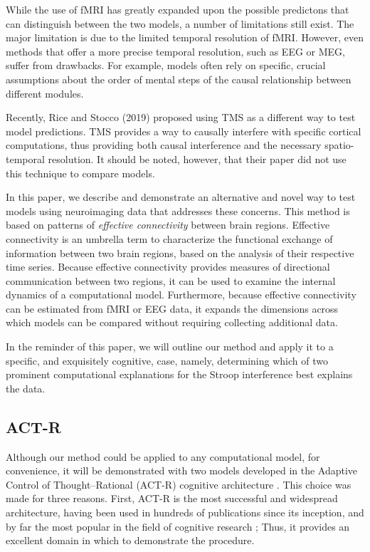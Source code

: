 \documentclass[10pt,letterpaper]{article}
\begin{document}
While the use of fMRI has greatly expanded upon the possible predictons that can distinguish between the two models, a number of limitations still exist. The major limitation is due to the limited temporal resolution of fMRI. 
However, even methods that offer a more precise temporal resolution, such as EEG or MEG, suffer from drawbacks. For example, models often rely on specific, crucial assumptions about the order of mental steps of the causal relationship between different modules. 

Recently, Rice and Stocco (2019) proposed using TMS as a different way to test model predictions. TMS provides a way to causally interfere with specific cortical computations, thus providing both causal interference and the necessary spatio-temporal resolution. It should be noted, however, that their paper did not use this technique to compare models. 

In this paper, we describe and demonstrate an alternative and novel way to test models using neuroimaging data that addresses these concerns. This method is based on patterns of {\it effective connectivity} between brain regions. Effective connectivity is an umbrella term to characterize the functional exchange of information between two brain regions, based on the analysis of their respective time series. Because effective connectivity provides measures of directional communication between two regions, it can be used to examine the internal dynamics of a computational model.  Furthermore, because effective connectivity can be estimated from fMRI or EEG data, it expands the dimensions across which models can be compared without requiring collecting additional data.

In the reminder of this paper, we will outline our method and apply it to a specific, and exquisitely cognitive, case, namely, determining which of two prominent computational explanations for the Stroop interference best explains the data.    

\subsection{ACT-R}

Although our method could be applied to any computational model, for convenience, it will be demonstrated with two models developed in the Adaptive Control of Thought--Rational (ACT-R) cognitive architecture \cite{Anderson2004}. This choice was made for three reasons.  First, ACT-R is the most successful and widespread architecture, having been used in hundreds of publications since its inception, and by far the most popular in the field of cognitive research \cite{Kotseruba2018}; Thus, it provides an excellent domain in which to demonstrate the procedure.
\end{document}

